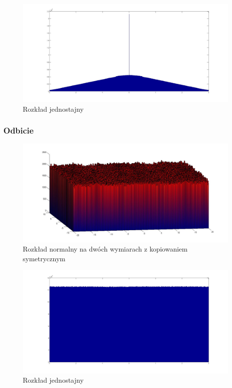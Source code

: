 \documentclass{mini}
\begin{document}
\begin{figure}[H]
\centering
\includegraphics[width=\textwidth]{ri_j_20M_1__3_3}
\caption{Rozkład jednostajny}
\end{figure}

\subsubsection*{Odbicie}

\begin{figure}[H]
\centering
\includegraphics[width=\textwidth]{rf_n_10M_2__20_20__10_10_4_2}
\caption{Rozkład normalny na dwóch wymiarach z kopiowaniem symetrycznym}
\end{figure}

\begin{figure}[H]
\centering
\includegraphics[width=\textwidth]{rf_j_100M_1__3_3}
\caption{Rozkład jednostajny}
\end{figure}
\end{document}
